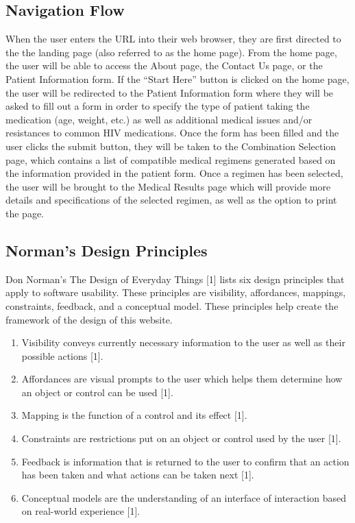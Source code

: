 \documentclass[12pt]{article}
\begin{document}
\subsection{Navigation Flow}
When the user enters the URL into their web browser, they are first directed to the the landing page (also referred to as the home page). From the home page, the user will be able to access the About page, the Contact Us page, or the Patient Information form. If the “Start Here” button is clicked on the home page, the user will be redirected to the Patient Information form where they will be asked to fill out a form in order to specify the type of patient taking the medication (age, weight, etc.) as well as additional medical issues and/or resistances to common HIV medications. Once the form has been filled and the user clicks the submit button, they will be taken to the Combination Selection page, which contains a list of compatible medical regimens generated based on the information provided in the patient form. Once a  regimen has been selected, the user will be brought to the Medical Results page which will provide more details and specifications of the selected regimen, as well as the option to print the page.

\subsection{Norman’s Design Principles}
Don Norman’s The Design of Everyday Things [1] lists six design principles that apply to software usability. These principles are visibility, affordances, mappings, constraints, feedback, and a conceptual model. These principles help create the framework of the design of this website.

\begin{enumerate}
\item Visibility conveys currently necessary information to the user as well as their possible actions [1].
\item Affordances are visual prompts to the user which helps them determine how an object or control can be used [1].
\item Mapping is the function of a control and its effect [1].
\item Constraints are restrictions put on an object or control used by the user [1].
\item Feedback is information that is returned to the user to confirm that an action has been taken and what actions can be taken next [1].
\item Conceptual models are the understanding of an interface of interaction based on real-world experience [1].
\end{enumerate}
\end{document}
